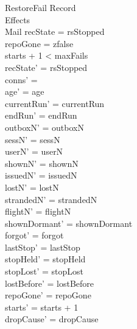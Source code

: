 \documentclass[a4paper,10pt,fleqn]{article}
\begin{document}
\begin{schema}{RestoreFail}
  \Delta Record \\
  \Xi Effects \\
  \Delta Mail
  \where
  recState = rsStopped \\
  repoGone = zfalse \\
  starts + 1 < maxFails \\
  recState' = rsStopped \\
  conns' = \emptyset \\
  age' = age \\
  currentRun' = currentRun \\
  endRun' = endRun \\
  outboxN' = outboxN \\
  sessN' = sessN \\
  userN' = userN \\
  shownN' = shownN \\
  issuedN' = issuedN \\
  lostN' = lostN \\
  strandedN' = strandedN \\
  flightN' = flightN \\
  shownDormant' = shownDormant \\
  forgot' = forgot \\
  lastStop' = lastStop \\
  stopHeld' = stopHeld \\
  stopLost' = stopLost \\
  lostBefore' = lostBefore \\
  repoGone' = repoGone \\
  starts' = starts + 1 \\
  dropCause' = dropCause
\end{schema}
\end{document}
